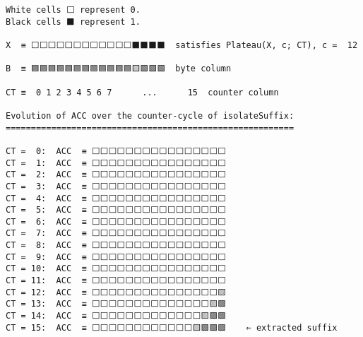 \documentclass[varwidth=\maxdimen,margin=0.5cm,multi={verbatim}]{standalone}
\begin{document}
\begin{verbatim}
White cells ⬜ represent 0.
Black cells ⬛ represent 1.

X  ≡ ⬜⬜⬜⬜⬜⬜⬜⬜⬜⬜⬜⬜⬛⬛⬛⬛  satisfies Plateau(X, c; CT), c =  12
                               
B  ≡ 🟦🟦🟦🟦🟦🟦🟦🟦🟦🟦🟦🟦🟨🟩🟩🟩  byte column

CT ≡  0 1 2 3 4 5 6 7      ...      15  counter column

Evolution of ACC over the counter-cycle of isolateSuffix:
=========================================================

CT =  0:  ACC  ≡ ⬜⬜⬜⬜⬜⬜⬜⬜⬜⬜⬜⬜⬜⬜⬜⬜
CT =  1:  ACC  ≡ ⬜⬜⬜⬜⬜⬜⬜⬜⬜⬜⬜⬜⬜⬜⬜⬜
CT =  2:  ACC  ≡ ⬜⬜⬜⬜⬜⬜⬜⬜⬜⬜⬜⬜⬜⬜⬜⬜
CT =  3:  ACC  ≡ ⬜⬜⬜⬜⬜⬜⬜⬜⬜⬜⬜⬜⬜⬜⬜⬜
CT =  4:  ACC  ≡ ⬜⬜⬜⬜⬜⬜⬜⬜⬜⬜⬜⬜⬜⬜⬜⬜
CT =  5:  ACC  ≡ ⬜⬜⬜⬜⬜⬜⬜⬜⬜⬜⬜⬜⬜⬜⬜⬜
CT =  6:  ACC  ≡ ⬜⬜⬜⬜⬜⬜⬜⬜⬜⬜⬜⬜⬜⬜⬜⬜
CT =  7:  ACC  ≡ ⬜⬜⬜⬜⬜⬜⬜⬜⬜⬜⬜⬜⬜⬜⬜⬜
CT =  8:  ACC  ≡ ⬜⬜⬜⬜⬜⬜⬜⬜⬜⬜⬜⬜⬜⬜⬜⬜
CT =  9:  ACC  ≡ ⬜⬜⬜⬜⬜⬜⬜⬜⬜⬜⬜⬜⬜⬜⬜⬜
CT = 10:  ACC  ≡ ⬜⬜⬜⬜⬜⬜⬜⬜⬜⬜⬜⬜⬜⬜⬜⬜
CT = 11:  ACC  ≡ ⬜⬜⬜⬜⬜⬜⬜⬜⬜⬜⬜⬜⬜⬜⬜⬜
CT = 12:  ACC  ≡ ⬜⬜⬜⬜⬜⬜⬜⬜⬜⬜⬜⬜⬜⬜⬜🟨
CT = 13:  ACC  ≡ ⬜⬜⬜⬜⬜⬜⬜⬜⬜⬜⬜⬜⬜⬜🟨🟩
CT = 14:  ACC  ≡ ⬜⬜⬜⬜⬜⬜⬜⬜⬜⬜⬜⬜⬜🟨🟩🟩
CT = 15:  ACC  ≡ ⬜⬜⬜⬜⬜⬜⬜⬜⬜⬜⬜⬜🟨🟩🟩🟩    ⇐ extracted suffix
\end{verbatim}
\end{document}
